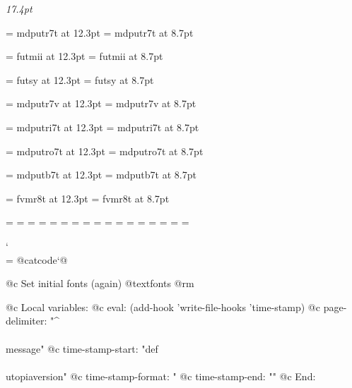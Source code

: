 
\setfont\shortcontrm\rmfontprefix\rmshape{17.4pt}
\setfont\shortcontbf\rmfontprefix\bxshape{17.4pt}
\setfont\shortcontsl\rmfontprefix\slshape{17.4pt}

\setfont\keyrm\rmfontprefix\rmshape{11.6pt}
\setfont\keysy\mtfontprefix\mtsyshape{13.1pt}

\setfont\ordrm\rmfontprefix\rmshape{11pt}
\setfont\fordrm\rmfontprefix\rmshape{9.6pt}

\let\subtitlerm=\textbf
\def\subtitlefont{\subtitlerm \normalbaselineskip = 22pt \normalbaselines}


\font\eightrm=	mdputr7t at 12.3pt
\font\sixrm=	mdputr7t at 8.7pt

\font\eighti=	futmii at 12.3pt
\font\sixi=	futmii at 8.7pt

\font\eightsy=	futsy at 12.3pt
\font\sixsy=	futsy at 8.7pt

\font\eightex=	mdputr7v at 12.3pt
\font\sixex=	mdputr7v at 8.7pt

\font\eightit=	mdputri7t at 12.3pt
\font\sixit=	mdputri7t at 8.7pt

\font\eightsl=	mdputro7t at 12.3pt
\font\sixsl=	mdputro7t at 8.7pt

\font\eightbf=	mdputb7t at 12.3pt
\font\sixbf=	mdputb7t at 8.7pt

\font\eighttt=	fvmr8t at 12.3pt
\font\sixtt=	fvmr8t at 8.7pt

=\eightrm
{}=\sixrm
%
=\eighti
{}=\sixi
%
=\eightsy
{}=\sixsy
%
=\elevenex
{}=\eightex
{}=\sixex
%
\scriptfont\itfam=\eightit
\scriptscriptfont\itfam=\sixit
%
\scriptfont\slfam=\eightsl
\scriptscriptfont\slfam=\sixsl
%
\scriptfont\bffam=\eightbf
\scriptscriptfont\bffam=\sixbf
%
\scriptfont\ttfam=\eighttt
\scriptscriptfont\ttfam=\sixtt


\let\setfont=\setfontorig
\def\setfontorig{\relax}

\catcode`\\=\active
@catcode`@%

@c Set initial fonts (again)
@textfonts
@rm

@c Local variables:
@c eval: (add-hook 'write-file-hooks 'time-stamp)
@c page-delimiter: "^\\\\message"
@c time-stamp-start: "def\\\\utopiaversion{"
@c time-stamp-format: "%
@c time-stamp-end: "}"
@c End:
